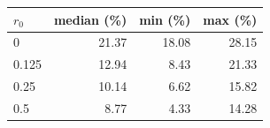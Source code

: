 \begin{tabular}{@{}lrrr@{}}
\toprule
$r_0$ & median (\%) & min (\%) & max (\%) \\
\midrule
0 & 21.37 & 18.08 & 28.15 \\
0.125 & 12.94 & 8.43 & 21.33 \\
0.25 & 10.14 & 6.62 & 15.82 \\
0.5 & 8.77 & 4.33 & 14.28 \\
\bottomrule
\end{tabular}
